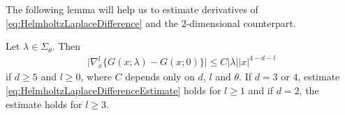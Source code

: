 The following lemma will help us to estimate derivatives of \eqref{eq:HelmholtzLaplaceDifference} and the $2$-dimensional counterpart.

\begin{lem}
  \label{lem:HelmholtzLaplaceDifference}
  Let $\lambda \in \Sigma_\theta$.
  Then
  \begin{align}
    \label{eq:HelmholtzLaplaceDifferenceEstimate}
    \Big|\nabla_x^l \Big\{ G(x; \lambda) - G(x; 0) \Big\}\Big| \leq C |\lambda| |x|^{4 - d - l}
  \end{align}
  if $d \geq 5$ and $l \geq 0$, where $C$ depends only on $d$, $l$ and $\theta$.
  If $d = 3$ or $4$, estimate \eqref{eq:HelmholtzLaplaceDifferenceEstimate} holds for $l \geq 1$ and if $d = 2$, the estimate holds for $l \geq 3$.
\end{lem}


